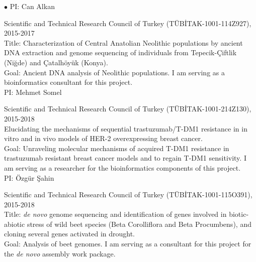 \documentclass[margin,line]{res}
\newenvironment{list2}{
  \begin{list}{$\bullet$}{%
      \setlength{\itemsep}{0in}
      \setlength{\parsep}{0in} \setlength{\parskip}{0in}
      \setlength{\topsep}{0in} \setlength{\partopsep}{0in} 
      \setlength{\leftmargin}{0.2in}}}{\end{list}}
\begin{document}
\begin{resume}
\begin{list2}
                                         PI: Can Alkan
                                       \item
                                         Scientific and Technical Research Council of Turkey (T\"{U}B\.{I}TAK-1001-114Z927), 2015-2017\\
                                         Title: Characterization of Central Anatolian Neolithic populations by ancient DNA extraction and genome sequencing of individuals 
                                         from Tepecik-Çiftlik (Niğde) and Çatalhöyük (Konya).\\
                                         Goal: Ancient DNA analysis of Neolithic populations. I am serving as a bioinformatics consultant for this project.\\
                                         PI: Mehmet Somel
                                       \item
                                         Scientific and Technical Research Council of Turkey (T\"{U}B\.{I}TAK-1001-214Z130), 2015-2018\\
                                         Elucidating the mechanisms of sequential trastuzumab/T-DM1 resistance in in vitro and in vivo models of HER-2
                                         overexpressing breast cancer.\\
                                         Goal: Unraveling molecular mechanisms of acquired T-DM1 resistance in trastuzumab resistant breast 
                                         cancer models and to regain T-DM1 sensitivity. I am serving as a researcher 
                                         for the bioinformatics components of this project.\\
                                         PI: Özgür Şahin
                                       \item
                                         Scientific and Technical Research Council of Turkey (T\"{U}B\.{I}TAK-1001-115O391), 2015-2018\\
                                         Title: {\it de novo} genome sequencing and identification of genes involved in biotic-abiotic stress of wild beet species 
                                         (Beta Corolliflora and Beta Procumbens), and cloning several genes activated in drought.\\
                                         Goal: Analysis of beet genomes. I am serving as a consultant for this project for the {\it de novo} assembly work package.\\

\end{list2}
\end{resume}
\end{document}
